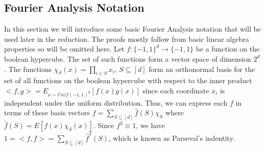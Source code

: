 \documentclass{article}
\newcommand{\1}{\mathbbm{1}}
\begin{document}
\subsection*{Fourier Analysis Notation}
In this section we will introduce some basic Fourier Analysis notation that will be used later in the reduction. The proofs mostly follow from basic linear algebra properties so will be omitted here. Let $f:\{-1,1\}^d\rightarrow \{-1,1\}$ be a function on the boolean hypercube. The set of such functions form a vector space of dimension $2^d$. The functions $\chi_S(x) = \prod_{i\in S}x_i$, $S\subseteq [d]$ form an orthonormal basis for the set of all functions on the boolean hypercube with respect to the inner product $<f,g> = E_{x\sim Unif(-1,1)^d}[f(x)g(x)]$ since each coordinate $x_i$ is independent under the uniform distribution. Thus, we can express each $f$ in terms of these basis vectors $f=\sum_{S\subseteq [d]}\hat{f}(S)\chi_S$ where $\hat{f}(S) = E[f(x)\chi_S(x)]$. Since $f^2 \equiv 1$, we have $1 = <f,f> = \sum_{S\subseteq [d]}\hat{f}^2(S)$, which is known as Parseval's indentity.
\end{document}
